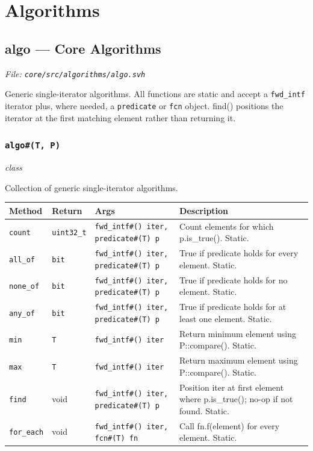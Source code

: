 \documentclass[11pt,letterpaper]{report}
\begin{document}
\chapter{Algorithms}
\section{algo --- Core Algorithms}
\noindent\small\textit{File: \texttt{core/src/algorithms/algo.svh}}\par

Generic single-iterator algorithms. All functions are static and accept a \texttt{fwd\_intf} iterator plus, where needed, a \texttt{predicate} or \texttt{fcn} object. find() positions the iterator at the first matching element rather than returning it.

\subsection*{\texttt{algo\#(T, P)}}
\noindent\small\textit{class}\par

Collection of generic single-iterator algorithms.

\begin{xltabular}{\linewidth}{>{\small}p{1.35in} >{\small}p{1.25in} >{\small}p{0.95in} >{\small}X}
\toprule
\textbf{Method} & \textbf{Return} & \textbf{Args} & \textbf{Description} \\
\midrule
\endhead
\bottomrule
\endfoot
\texttt{count} & \texttt{uint32\_t} & \texttt{fwd\_intf\#() iter, predicate\#(T) p} & Count elements for which p.is\_true(). Static. \\
\texttt{all\_of} & \texttt{bit} & \texttt{fwd\_intf\#() iter, predicate\#(T) p} & True if predicate holds for every element. Static. \\
\texttt{none\_of} & \texttt{bit} & \texttt{fwd\_intf\#() iter, predicate\#(T) p} & True if predicate holds for no element. Static. \\
\texttt{any\_of} & \texttt{bit} & \texttt{fwd\_intf\#() iter, predicate\#(T) p} & True if predicate holds for at least one element. Static. \\
\texttt{min} & \texttt{T} & \texttt{fwd\_intf\#() iter} & Return minimum element using P::compare(). Static. \\
\texttt{max} & \texttt{T} & \texttt{fwd\_intf\#() iter} & Return maximum element using P::compare(). Static. \\
\texttt{find} & void & \texttt{fwd\_intf\#() iter, predicate\#(T) p} & Position iter at first element where p.is\_true(); no-op if not found. Static. \\
\texttt{for\_each} & void & \texttt{fwd\_intf\#() iter, fcn\#(T) fn} & Call fn.f(element) for every element. Static. \\
\end{xltabular}
\end{document}
